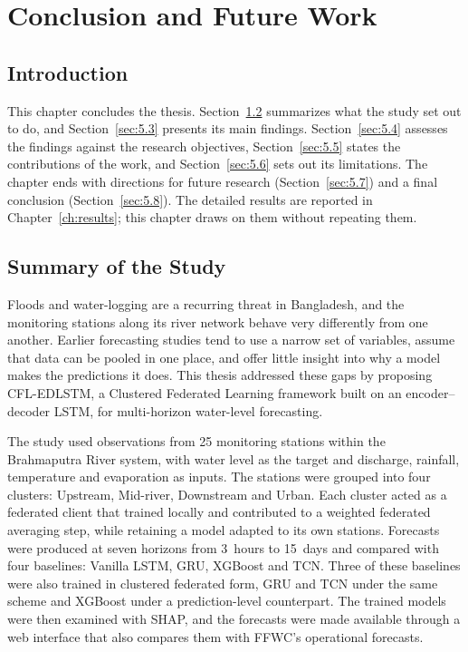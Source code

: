 \chapter{Conclusion and Future Work}
\label{Ch_Chapter5}

\section{Introduction}
\label{sec:5.1}

This chapter concludes the thesis. Section~\ref{sec:5.2} summarizes what the
study set out to do, and Section~\ref{sec:5.3} presents its main findings.
Section~\ref{sec:5.4} assesses the findings against the research objectives,
Section~\ref{sec:5.5} states the contributions of the work, and
Section~\ref{sec:5.6} sets out its limitations. The chapter ends with
directions for future research (Section~\ref{sec:5.7}) and a final conclusion
(Section~\ref{sec:5.8}). The detailed results are reported in
Chapter~\ref{ch:results}; this chapter draws on them without repeating them.

\section{Summary of the Study}
\label{sec:5.2}

Floods and water-logging are a recurring threat in Bangladesh, and the
monitoring stations along its river network behave very differently from one
another. Earlier forecasting studies tend to use a narrow set of variables,
assume that data can be pooled in one place, and offer little insight into why
a model makes the predictions it does. This thesis addressed these gaps by
proposing CFL-EDLSTM, a Clustered Federated Learning framework built on an
encoder--decoder LSTM, for multi-horizon water-level forecasting.

The study used observations from 25 monitoring stations within the Brahmaputra
River system, with water level as the target and discharge, rainfall,
temperature and evaporation as inputs. The stations were grouped into four
clusters: Upstream, Mid-river, Downstream and Urban. Each cluster acted as a
federated client that trained locally and contributed to a weighted federated
averaging step, while retaining a model adapted to its own stations. Forecasts
were produced at seven horizons from 3~hours to 15~days and compared with four
baselines: Vanilla LSTM, GRU, XGBoost and TCN. Three of these baselines were
also trained in clustered federated form, GRU and TCN under the same scheme and
XGBoost under a prediction-level counterpart. The trained models were then
examined with SHAP, and the forecasts were made available through a web
interface that also compares them with FFWC's operational forecasts.

